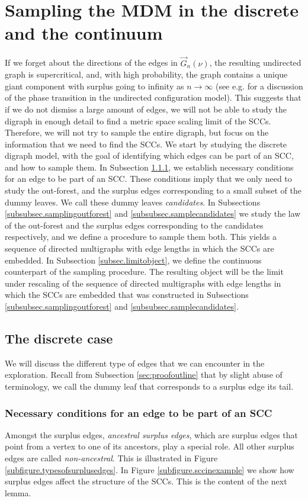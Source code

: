 \section{Sampling the MDM in the discrete and the continuum}
If we forget about the directions of the edges in $\vec{G}_n(\nu)$, the resulting undirected graph is supercritical, and, with high probability, the graph contains a unique giant component with surplus going to infinity as $n\to \infty$ (see e.g. \cite{molloyCriticalPointRandom1995,molloySizeGiantComponent1998,jansonNewApproachGiant2009} for a discussion of the phase transition in the undirected configuration model). This suggests that if we do not dismiss a large amount of edges, we will not be able to study the digraph in enough detail to find a metric space scaling limit of the SCCs. Therefore, we will not try to sample the entire digraph, but focus on the information that we need to find the SCCs. We start by studying the discrete digraph model, with the goal of identifying which edges can be part of an SCC, and how to sample them. In Subsection \ref{subsubsec.defcandidates}, we establish necessary conditions for an edge to be part of an SCC. These conditions imply that we only need to study the out-forest, and the surplus edges corresponding to a small subset of the dummy leaves. We call these dummy leaves \emph{candidates}. In Subsections \ref{subsubsec.samplingoutforest} and \ref{subsubsec.samplecandidates} we study the law of the out-forest and the surplus edges corresponding to the candidates respectively, and we define a procedure to sample them both. This yields a sequence of directed multigraphs with edge lengths in which the SCCs are embedded.  
In Subsection \ref{subsec.limitobject}, we define the continuous counterpart of the sampling procedure. The resulting object will be the limit under rescaling of the sequence of directed multigraphs with edge lengths in which the SCCs are embedded that was constructed in Subsections \ref{subsubsec.samplingoutforest} and \ref{subsubsec.samplecandidates}. 
\subsection{The discrete case}\label{subsec.discrete}
We will discuss the different type of edges that we can encounter in the exploration. Recall from Subsection \ref{sec:proofoutline} that by slight abuse of terminology, we call the dummy leaf that corresponds to a surplus edge its tail.

\subsubsection{Necessary conditions for an edge to be part of an SCC}\label{subsubsec.defcandidates}
Amongst the surplus edges, \emph{ancestral surplus edges}, which are surplus edges that point from a vertex to one of its ancestors, play a special role. All other surplus edges are called \emph{non-ancestral}. This is illustrated in Figure \ref{subfigure.typesofsurplusedges}. In Figure \ref{subfigure.sccinexample} we show how surplus edges affect the structure of the SCCs. This is the content of the next lemma.

